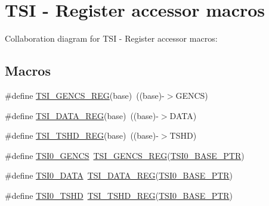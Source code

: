 \hypertarget{group___t_s_i___register___accessor___macros}{}\section{T\+SI -\/ Register accessor macros}
\label{group___t_s_i___register___accessor___macros}
Collaboration diagram for T\+SI -\/ Register accessor macros\+:
\subsection*{Macros}
\begin{DoxyCompactItemize}
\item 
\#define \hyperlink{group___t_s_i___register___accessor___macros_ga71c97f61d42d8b0ec0b77a23ca06b9f1}{T\+S\+I\+\_\+\+G\+E\+N\+C\+S\+\_\+\+R\+EG}(base)~((base)-\/$>$G\+E\+N\+CS)
\item 
\#define \hyperlink{group___t_s_i___register___accessor___macros_gaff76941d6e8fe865f4526e5a183e0d53}{T\+S\+I\+\_\+\+D\+A\+T\+A\+\_\+\+R\+EG}(base)~((base)-\/$>$D\+A\+TA)
\item 
\#define \hyperlink{group___t_s_i___register___accessor___macros_gac1d48eafdd0182d91ea6578926c038e9}{T\+S\+I\+\_\+\+T\+S\+H\+D\+\_\+\+R\+EG}(base)~((base)-\/$>$T\+S\+HD)
\item 
\#define \hyperlink{group___t_s_i___register___accessor___macros_gabe033284ba64fa3097ff12d10c0b5e85}{T\+S\+I0\+\_\+\+G\+E\+N\+CS}~\hyperlink{group___t_s_i___register___accessor___macros_ga71c97f61d42d8b0ec0b77a23ca06b9f1}{T\+S\+I\+\_\+\+G\+E\+N\+C\+S\+\_\+\+R\+EG}(\hyperlink{group___t_s_i___peripheral_gaf98ea1cd15559446e0cfc1ae177751f6}{T\+S\+I0\+\_\+\+B\+A\+S\+E\+\_\+\+P\+TR})
\item 
\#define \hyperlink{group___t_s_i___register___accessor___macros_gac08465d7c2f98c2c372c26e622a05126}{T\+S\+I0\+\_\+\+D\+A\+TA}~\hyperlink{group___t_s_i___register___accessor___macros_gaff76941d6e8fe865f4526e5a183e0d53}{T\+S\+I\+\_\+\+D\+A\+T\+A\+\_\+\+R\+EG}(\hyperlink{group___t_s_i___peripheral_gaf98ea1cd15559446e0cfc1ae177751f6}{T\+S\+I0\+\_\+\+B\+A\+S\+E\+\_\+\+P\+TR})
\item 
\#define \hyperlink{group___t_s_i___register___accessor___macros_ga8a7a92091c84eb3bddf218fa540d611f}{T\+S\+I0\+\_\+\+T\+S\+HD}~\hyperlink{group___t_s_i___register___accessor___macros_gac1d48eafdd0182d91ea6578926c038e9}{T\+S\+I\+\_\+\+T\+S\+H\+D\+\_\+\+R\+EG}(\hyperlink{group___t_s_i___peripheral_gaf98ea1cd15559446e0cfc1ae177751f6}{T\+S\+I0\+\_\+\+B\+A\+S\+E\+\_\+\+P\+TR})
\end{DoxyCompactItemize}


